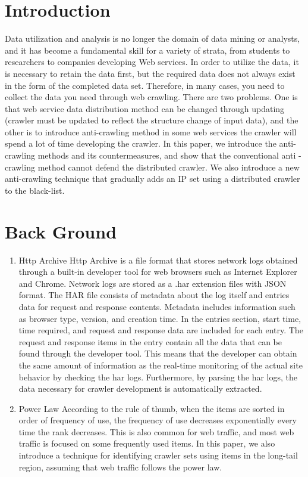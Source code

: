 \documentclass[letterpaper, 10 pt, conference]{ieeeconf}
\begin{document}
%
%
\section{Introduction}
Data utilization and analysis is no longer the domain of data mining or analysts, and it has become a fundamental skill for a variety of strata, from students to researchers to companies developing Web services. 
In order to utilize the data, it is necessary to retain the data first, but the required data does not always exist in the form of the completed data set. Therefore, in many cases, you need to collect the data you need through web crawling.
There are two problems. One is that web service data distribution method can be changed through updating (crawler must be updated to reflect the structure change of input data), and the other is to introduce anti-crawling method in some web services the crawler will spend a lot of time developing the crawler.
In this paper, we introduce the anti-crawling methods and its countermeasures, and show that the conventional anti - crawling method cannot defend the distributed crawler. We also introduce a new anti-crawling technique that gradually adds an IP set using a distributed crawler to the black-list.



%
%
\section{Back Ground}
\begin{enumerate}
\item Http Archive
\newline Http Archive is a file format that stores network logs obtained through a built-in developer tool for web browsers such as Internet Explorer and Chrome. Network logs are stored as a .har extension files with JSON format. The HAR file consists of metadata about the log itself and entries data for request and response contents. Metadata includes information such as browser type, version, and creation time. In the entries section, start time, time required, and request and response data are included for each entry.
The request and response items in the entry contain all the data that can be found through the developer tool. This means that the developer can obtain the same amount of information as the real-time monitoring of the actual site behavior by checking the har logs. Furthermore, by parsing the har logs, the data necessary for crawler development is automatically extracted.
\newline
\item Power Law
\newline 
According to the rule of thumb, when the items are sorted in order of frequency of use, the frequency of use decreases exponentially every time the rank decreases. This is also common for web traffic, and most web traffic is focused on some frequently used items. In this paper, we also introduce a technique for identifying crawler sets using items in the long-tail region, assuming that web traffic follows the power law.
\end{enumerate}
\end{document}
